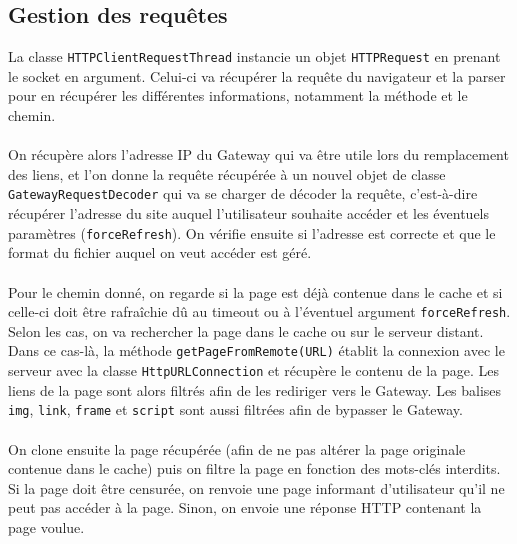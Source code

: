 \documentclass[a4paper,11pt]{article}
\begin{document}
	\subsection{Gestion des requêtes}
La classe \texttt{HTTPClientRequestThread} instancie un objet \texttt{HTTPRequest} en prenant le socket en argument. Celui-ci va récupérer la requête du navigateur et la parser pour en récupérer les différentes informations, notamment la méthode et le chemin.

\paragraph{}

On récupère alors l'adresse IP du Gateway qui va être utile lors du remplacement des liens, et l'on donne la requête récupérée à un nouvel objet de classe \texttt{GatewayRequestDecoder} qui va se charger de décoder la requête, c'est-à-dire récupérer l'adresse du site auquel l'utilisateur souhaite accéder et les éventuels paramètres (\texttt{forceRefresh}). On vérifie ensuite si l'adresse est correcte et que le format du fichier auquel on veut accéder est géré.

\paragraph{}

Pour le chemin donné, on regarde si la page est déjà contenue dans le cache et si celle-ci doit être rafraîchie dû au timeout ou à l'éventuel argument \texttt{forceRefresh}. Selon les cas, on va rechercher la page dans le cache ou sur le serveur distant. Dans ce cas-là, la méthode \texttt{getPageFromRemote(URL)} établit la connexion avec le serveur avec la classe \texttt{HttpURLConnection} et récupère le contenu de la page. Les liens de la page sont alors filtrés afin de les rediriger vers le Gateway. Les balises \texttt{img}, \texttt{link}, \texttt{frame} et \texttt{script} sont aussi filtrées afin de bypasser le Gateway. 

\paragraph{}

On clone ensuite la page récupérée (afin de ne pas altérer la page originale contenue dans le cache) puis on filtre la page en fonction des mots-clés interdits. Si la page doit être censurée, on renvoie une page informant d'utilisateur qu'il ne peut pas accéder à la page. Sinon, on envoie une réponse HTTP contenant la page voulue.
\end{document}
